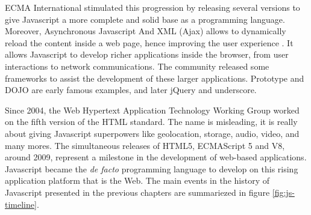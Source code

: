 ECMA International stimulated this progression by releasing several versions to give Java\-script a more complete and solid base as a programming language.
Moreover, %
Asynchronous Java\-script And XML (Ajax) allows to dynamically reload the content inside a web page, hence improving the user experience \cite{Garrett2005}.
It allows Java\-script to develop richer applications inside the browser, from user interactions to network communications.
The community released some frameworks to assist the development of these larger applications.
Prototype and DOJO are early famous examples, and later jQuery and underscore.


Since 2004, the Web Hypertext Application Technology Working Group worked on the fifth version of the HTML standard.
The name is misleading, it is really about giving Java\-script superpowers like geolocation, storage, audio, video, and many mores.
The simultaneous releases of HTML5, ECMAScript 5 and V8, around 2009, represent a milestone in the development of web-based applications.
Java\-script became the \textit{de facto} programming language to develop on this rising application platform that is the Web.
The main events in the history of Java\-script presented in the previous chapters are summariezed in figure \ref{fig:js-timeline}.

